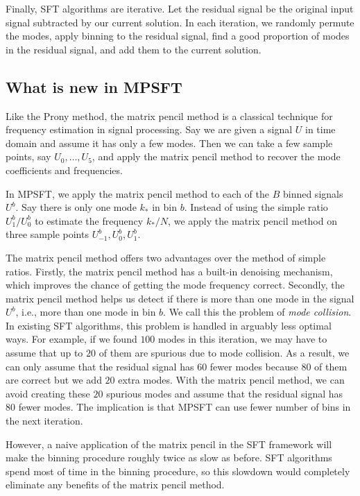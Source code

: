 \documentclass[10pt]{article}
\begin{document}
Finally, SFT algorithms are iterative. Let the residual signal be the original input signal subtracted by our current solution. In each iteration, we randomly permute the modes, apply binning to the residual signal, find a good proportion of modes in the residual signal, and add them to the current solution.

\subsection{What is new in MPSFT}
Like the Prony method, the matrix pencil method \cite{hua1990matpencil} is a classical technique for frequency estimation in signal processing. Say we are given a signal $U$ in time domain and assume it has only a few modes. Then we can take a few sample points, say $U_0,\ldots,U_5$, and apply the matrix pencil method to recover the mode coefficients and frequencies.

In MPSFT, we apply the matrix pencil method to each of the $B$ binned signals $U^b$. Say there is only one mode $k_*$ in bin $b$. Instead of using the simple ratio $U^b_1/U^b_0$ to estimate the frequency $k_*/N$, we apply the matrix pencil method on three sample points $U^b_{-1},U^b_{0},U^b_{1}$.

The matrix pencil method offers two advantages over the method of simple ratios. Firstly, the matrix pencil method has a built-in denoising mechanism, which improves the chance of getting the mode frequency correct. Secondly, the matrix pencil method helps us detect if there is more than one mode in the signal $U^b$, i.e., more than one mode in bin $b$. We call this the problem of \emph{mode collision}. In existing SFT algorithms, this problem is handled in arguably less optimal ways. For example, if we found $100$ modes in this iteration, we may have to assume that up to $20$ of them are spurious due to mode collision. As a result, we can only assume that the residual signal has $60$ fewer modes because $80$ of them are correct but we add $20$ extra modes. With the matrix pencil method, we can avoid creating these $20$ spurious modes and assume that the residual signal has $80$ fewer modes. The implication is that MPSFT can use fewer number of bins in the next iteration.

However, a naive application of the matrix pencil in the SFT framework will make the binning procedure roughly twice as slow as before. SFT algorithms spend most of time in the binning procedure, so this slowdown would completely eliminate any benefits of the matrix pencil method.
\end{document}
